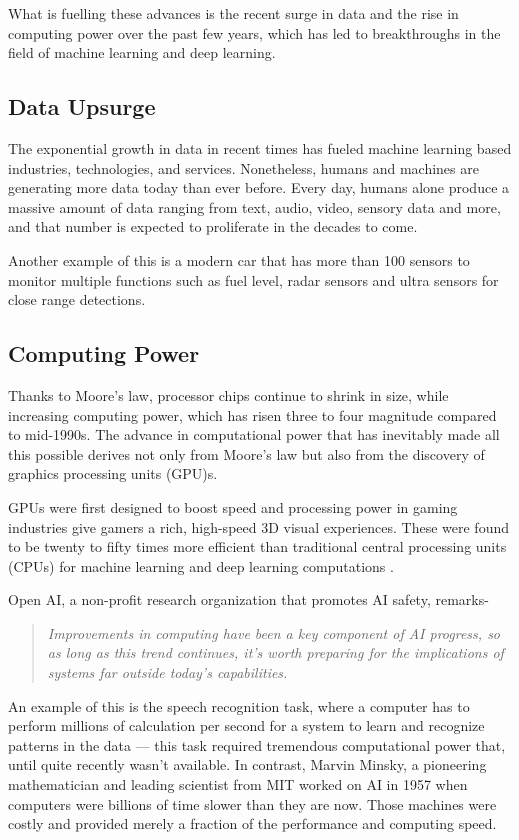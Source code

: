 What is fuelling these advances is the recent surge in data and the rise in computing power over the past few years, which has led to breakthroughs in the field of machine learning and deep learning.

\subsection{Data Upsurge}
The exponential growth in data in recent times has fueled machine learning based industries, technologies, and services. Nonetheless, humans and machines are generating more data today than ever before. Every day, humans alone produce a massive amount of data ranging from text, audio, video, sensory data and more, and that number is expected to proliferate in the decades to come. 

Another example of this is a modern car that has more than 100 sensors to monitor multiple functions such as fuel level, radar sensors and ultra sensors for close range detections.

\subsection{Computing Power}
Thanks to Moore’s law, processor chips continue to shrink in size, while increasing computing power, which has risen three to four magnitude compared to mid-1990s. The advance in computational power that has inevitably made all this possible derives not only from Moore’s law but also from the discovery of graphics processing units (GPU)s.

GPUs were first designed to boost speed and processing power in gaming industries give gamers a rich, high-speed 3D visual experiences. These were found to be twenty to fifty times more efficient than traditional central processing units (CPUs) for machine learning and deep learning computations \cite{Yosinski2015}.

Open AI, a non-profit research organization that promotes AI safety, remarks- \begin{quote}
    \textit{Improvements in computing have been a key component of AI progress, so as long as this trend continues, it’s worth preparing for the implications of systems far outside today’s capabilities.}
\end{quote}

An example of this is the speech recognition task, where a computer has to perform millions of calculation per second for a system to learn and recognize patterns in the data — this task required tremendous computational power that, until quite recently wasn't available. In contrast, Marvin Minsky, a pioneering mathematician and leading scientist from MIT worked on AI in 1957 when computers were billions of time slower than they are now. Those machines were costly and provided merely a fraction of the performance and computing speed.

